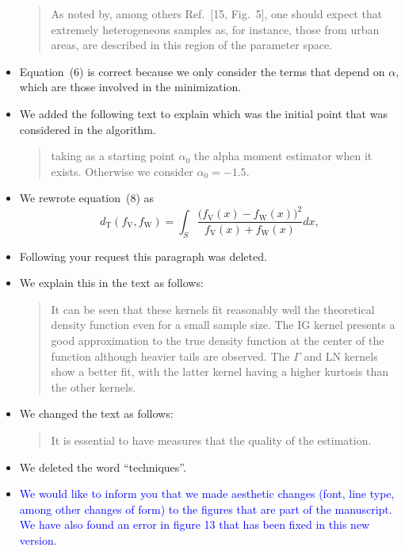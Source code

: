 \documentclass{ar2rc}
\begin{document}
\begin{itemize}
\begin{quote}
			As noted by, among others Ref.~[15, Fig.~5], one should expect that extremely heterogeneous samples as, for instance, those from urban areas, are described in this region of the parameter space.
		\end{quote}
		\item Equation~(6) is correct because we only consider the terms that depend on $\alpha$, which are those involved in the minimization.
		\item We added the following text to explain which was the initial point that was considered in the algorithm.
		\begin{quote}
			taking as a starting point $\alpha_0$ the alpha moment estimator when it exists. Otherwise we consider $\alpha_0=-1.5$.
		\end{quote}
		\item We rewrote equation~(8) as 
		\begin{equation}
			d_{\text{{T}}}(f_{\text{{V}}},f_{\text{{W}}})=\int_{S}\frac{\big(f_{\text{{V}}}(x)-f_{\text{{W}}}(x)\big)^2}{f_{\text{{V}}}(x)+f_{\text{{W}}}(x)}dx,
			\label{DT}
		\end{equation}
		
		\item Following your request this paragraph was deleted.
		\item We explain this in the text as follows:
		\begin{quote}
			It can be seen that these kernels fit reasonably well the theoretical density function even for a small sample size. The IG kernel presents a good approximation to the true density function at the center of the function although heavier tails are observed. The $\Gamma$ and LN kernels show a better fit, with the latter kernel having a higher kurtosis than the other kernels.
		\end{quote}
		\item We changed the text as follows:
		\begin{quote}		
			It is essential to have measures that \DIFdelbegin {} \DIFdelend \DIFaddbegin {}\DIFaddend the quality of the estimation. 
		\end{quote}
		\item We deleted the word ``techniques''.
		
		\item \textcolor{blue}{We would like to inform you that we made aesthetic changes (font, line type, among other changes of form) to the figures that are part of the manuscript.
			We have also found an error in figure 13 that has been fixed in this new version.}
	\end{itemize}
	
	
	
	
\end{document}
